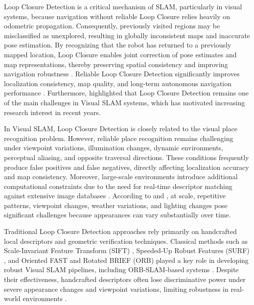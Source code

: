 \documentclass{ieeeaccess}
\begin{document}
Loop Closure Detection is a critical mechanism of SLAM, particularly in visual systems, because navigation without reliable Loop Closure relies heavily on odometric propagation. Consequently, previously visited regions may be misclassified as unexplored, resulting in globally inconsistent maps and inaccurate pose estimation. By recognizing that the robot has returned to a previously mapped location, Loop Closure enables joint correction of pose estimates and map representations, thereby preserving spatial consistency and improving navigation robustness \cite{Cadena2016SLAM,Taketomi2017VisualSLAMSurvey,Williams2009LoopClosingComparison}. Reliable Loop Closure Detection significantly improves localization consistency, map quality, and long-term autonomous navigation performance \cite{Lowry2016,Arshad2021}. Furthermore, \cite{Xu2022SiameseConvNetRGBDSLAM} highlighted that Loop Closure Detection remains one of the main challenges in Visual SLAM systems, which has motivated increasing research interest in recent years.

In Visual SLAM, Loop Closure Detection is closely related to the visual place recognition problem. However, reliable place recognition remains challenging under viewpoint variations, illumination changes, dynamic environments, perceptual aliasing, and opposite traversal directions. These conditions frequently produce false positives and false negatives, directly affecting localization accuracy and map consistency. Moreover, large-scale environments introduce additional computational constraints due to the need for real-time descriptor matching against extensive image databases \cite{Lowry2016,Garg2018DontLookBack,Naseer2014NetworkFlowsSeasons,Arshad2021,Wang2024SemanticLineGraphLoopClosure}. According to \cite{AliBey2023MixVPR} and \cite{Wang2024SemanticLineGraphLoopClosure}, at scale, repetitive patterns, viewpoint changes, weather variations, and lighting changes pose significant challenges because appearances can vary substantially over time.

Traditional Loop Closure Detection approaches rely primarily on handcrafted local descriptors and geometric verification techniques. Classical methods such as Scale-Invariant Feature Transform (SIFT) \cite{Lowe2004SIFT}, Speeded-Up Robust Features (SURF) \cite{Bay2006SURF}, and Oriented FAST and Rotated BRIEF (ORB) \cite{Campos2021ORBSLAM3} played a key role in developing robust Visual SLAM pipelines, including ORB-SLAM-based systems \cite{MurArtal2017ORBSLAM2,Campos2021ORBSLAM3}. Despite their effectiveness, handcrafted descriptors often lose discriminative power under severe appearance changes and viewpoint variations, limiting robustness in real-world environments \cite{Lowry2016,Arshad2021}. 
\end{document}
